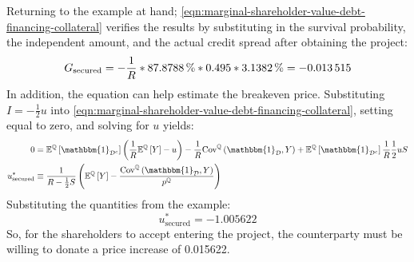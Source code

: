 \documentclass[main.tex]{subfiles}
\begin{document}
        Returning to the example at hand;
        \cref{eqn:marginal-shareholder-value-debt-financing-collateral} verifies the results
        by substituting in the survival probability, the independent amount, 
        and the actual credit spread after obtaining the project:
            \begin{equation*}
                G_{\text{secured}}
                =
                - 
                \discountfactor
                *
                \pct{0.878788}
                *
                \num{0.495}
                *
                \pct{0.031382}
                =
                -\num{0.013515}
            \end{equation*}
        In addition, the equation can help estimate the breakeven price.
        Substituting $I=-\frac{1}{2} u$ into 
        \cref{eqn:marginal-shareholder-value-debt-financing-collateral}, 
        setting equal to zero, and solving for $u$ yields:
            \begin{align*}
                0
                &=
                    \mathbb{E}^{\mathbb{Q}}\left[\mathbbm{1}_{\mathcal{D}^{c}}\right] 
                    \left(
                        \discountfactor
                        \mathbb{E}^{\mathbb{Q}}\left[Y\right] 
                        - u
                    \right)
                    -
                    \discountfactor
                    \text{Cov}^{\mathbb{Q}}\left(\mathbbm{1}_{\mathcal{D}}, Y\right) 
                    +
                    \mathbb{E}^{\mathbb{Q}}\left[
                        \mathbbm{1}_{\mathcal{D}^{c}}
                    \right] \discountfactor \frac{1}{2} u S
                    \nonumber \\
                u^{\ast}_{\text{secured}}
                &\equiv
                    \frac{
                        1
                    }{
                        \grossrfrate - \frac{1}{2} S
                    } 
                    \left(
                        \mathbb{E}^{\mathbb{Q}}\left[Y\right]
                        - \frac{
                            \text{Cov}^{\mathbb{Q}}\left(\mathbbm{1}_{\mathcal{D}}, Y\right)
                        }{
                            p^{\mathbb{Q}}  
                        } 
                    \right)
            \end{align*}
        Substituting the quantities from the example:
            \begin{equation*}
                u^{\ast}_{\text{secured}}
                =
                \num{-1.005622}
            \end{equation*}    
        So, for the shareholders to accept entering the project,
        the counterparty must be willing to donate a price increase of \num{0.015622}.
        
\end{document}
